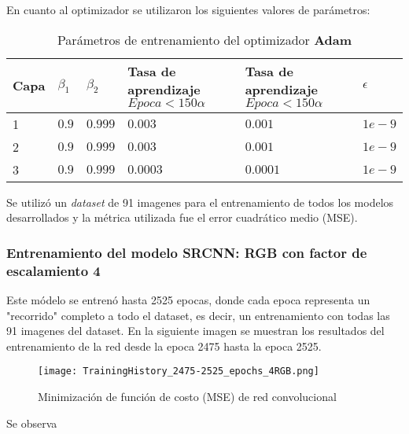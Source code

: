 En cuanto al optimizador se utilizaron los siguientes valores de parámetros:

\begin{table}[H]
    \centering
    \caption{Parámetros de entrenamiento del optimizador \textbf{Adam}}
    \begin{tabular}{|l|l|l|l|l|}
    \hline
    \textbf{Capa} & \textbf{$\beta_1$} & \textbf{$\beta_2$}  & \textbf{Tasa de aprendizaje $Epoca<150$\n$\alpha$} & \textbf{Tasa de aprendizaje $Epoca<150$\n$\alpha$} & \textbf{$\epsilon$}\\              & $0.9$              & $0.999$             & $0.003$ & $0.001$          & $1e-9$                 \\
    2             & $0.9$              & $0.999$             & $0.003$ & $0.001$          & $1e-9$                 \\
    3             & $0.9$              & $0.999$             & $0.0003$ & $0.0001$        & $1e-9$                 \\ \hline
    \end{tabular}
\end{table}

Se utilizó un \emph{dataset} de 91 imagenes para el entrenamiento de todos los modelos desarrollados y la métrica utilizada fue el
error cuadrático medio (MSE).

\subsubsection{Entrenamiento del modelo SRCNN: RGB con factor de escalamiento 4}
Este módelo se entrenó hasta 2525 epocas, donde cada epoca representa un "recorrido" completo a todo el dataset, es decir, un
entrenamiento con todas las 91 imagenes del dataset. En la siguiente imagen se muestran los resultados del entrenamiento de la
red desde la epoca 2475 hasta la epoca 2525.

\begin{figure}[H]
    \label{fig:SRCNN_MSE_TrainingLoss4RGB}
    \centering
    \texttt{[image: TrainingHistory\_2475-2525\_epochs\_4RGB.png]}
    \caption{Minimización de función de costo (MSE) de red convolucional}
\end{figure}

Se observa 